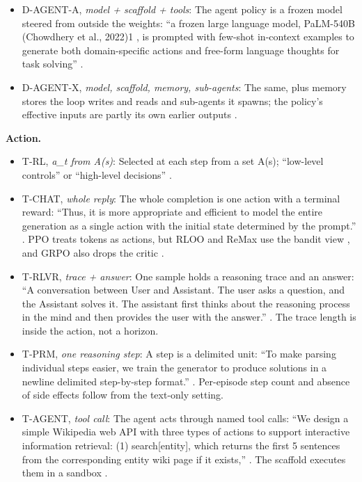 \documentclass{article}
\providecommand{\tightlist}{\setlength{\itemsep}{0pt}\setlength{\parskip}{0pt}}
\begin{document}
\begin{itemize}
\item
  D-AGENT-A, \emph{model + scaffold + tools}: The agent policy is a frozen model steered from outside the weights: ``a frozen large language model, PaLM-540B (Chowdhery et al., 2022)1 , is prompted with few-shot in-context examples to generate both domain-specific actions and free-form language thoughts for task solving'' \citep{yao2023b}.
\item
  D-AGENT-X, \emph{model, scaffold, memory, sub-agents}: The same, plus memory stores the loop writes and reads and sub-agents it spawns; the policy's effective inputs are partly its own earlier outputs \citep{chen2024, hammond2025}.
\end{itemize}

\textbf{Action.}

\begin{itemize}
\tightlist
\item
  T-RL, \emph{a\_t from A(s)}: Selected at each step from a set A(s); ``low-level controls'' or ``high-level decisions'' \citep{sutton2018}.
\item
  T-CHAT, \emph{whole reply}: The whole completion is one action with a terminal reward: ``Thus, it is more appropriate and efficient to model the entire generation as a single action with the initial state determined by the prompt.'' \citep{ahmadian2024}. PPO treats tokens as actions, but RLOO and ReMax use the bandit view \citep{ahmadian2024, li2024}, and GRPO also drops the critic \citep{shao2024}.
\item
  T-RLVR, \emph{trace + answer}: One sample holds a reasoning trace and an answer: ``A conversation between User and Assistant. The user asks a question, and the Assistant solves it. The assistant first thinks about the reasoning process in the mind and then provides the user with the answer.'' \citep{deepseekai2025}. The trace length is inside the action, not a horizon.
\item
  T-PRM, \emph{one reasoning step}: A step is a delimited unit: ``To make parsing individual steps easier, we train the generator to produce solutions in a newline delimited step-by-step format.'' \citep{lightman2024}. Per-episode step count and absence of side effects follow from the text-only setting.
\item
  T-AGENT, \emph{tool call}: The agent acts through named tool calls: ``We design a simple Wikipedia web API with three types of actions to support interactive information retrieval: (1) search{[}entity{]}, which returns the first 5 sentences from the corresponding entity wiki page if it exists,'' \citep{yao2023b}. The scaffold executes them in a sandbox \citep{jimenez2024}.

\end{itemize}
\end{document}
